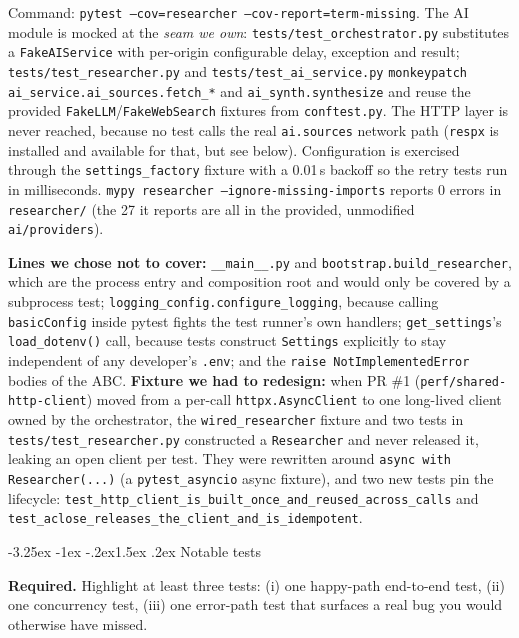 \documentclass[11pt,a4paper]{article}
\makeatletter
\renewcommand\subsection{\@startsection{subsection}{2}{\z@}%
    {-3.25ex \@plus -1ex \@minus -.2ex}{1.5ex \@plus .2ex}%
    {\normalfont\large\bfseries\color{accent}}}%
\makeatother
\begin{document}
Command: \texttt{pytest --cov=researcher --cov-report=term-missing}. The AI module is mocked at the \emph{seam we own}: \texttt{tests/test\_orchestrator.py} substitutes a \texttt{FakeAIService} with per-origin configurable delay, exception and result; \texttt{tests/test\_researcher.py} and \texttt{tests/test\_ai\_service.py} \texttt{monkeypatch} \texttt{ai\_service.ai\_sources.fetch\_*} and \texttt{ai\_synth.synthesize} and reuse the provided \texttt{FakeLLM}/\texttt{FakeWebSearch} fixtures from \texttt{conftest.py}. The HTTP layer is never reached, because no test calls the real \texttt{ai.sources} network path (\texttt{respx} is installed and available for that, but see below). Configuration is exercised through the \texttt{settings\_factory} fixture with a 0.01\,s backoff so the retry tests run in milliseconds. \texttt{mypy researcher --ignore-missing-imports} reports 0 errors in \texttt{researcher/} (the 27 it reports are all in the provided, unmodified \texttt{ai/providers}).

\textbf{Lines we chose not to cover:} \texttt{\_\_main\_\_.py} and \texttt{bootstrap.build\_researcher}, which are the process entry and composition root and would only be covered by a subprocess test; \texttt{logging\_config.configure\_logging}, because calling \texttt{basicConfig} inside pytest fights the test runner's own handlers; \texttt{get\_settings}'s \texttt{load\_dotenv()} call, because tests construct \texttt{Settings} explicitly to stay independent of any developer's \texttt{.env}; and the \texttt{raise NotImplementedError} bodies of the ABC. \textbf{Fixture we had to redesign:} when PR \#1 (\texttt{perf/shared-http-client}) moved from a per-call \texttt{httpx.AsyncClient} to one long-lived client owned by the orchestrator, the \texttt{wired\_researcher} fixture and two tests in \texttt{tests/test\_researcher.py} constructed a \texttt{Researcher} and never released it, leaking an open client per test. They were rewritten around \texttt{async with Researcher(...)} (a \texttt{pytest\_asyncio} async fixture), and two new tests pin the lifecycle: \texttt{test\_http\_client\_is\_built\_once\_and\_reused\_across\_calls} and \texttt{test\_aclose\_releases\_the\_client\_and\_is\_idempotent}.

\subsection{Notable tests}

\begin{deliverbox}
\textbf{Required.} Highlight at least three tests: (i) one happy-path end-to-end test, (ii) one concurrency test, (iii) one error-path test that surfaces a real bug you would otherwise have missed.
\end{deliverbox}
\end{document}
